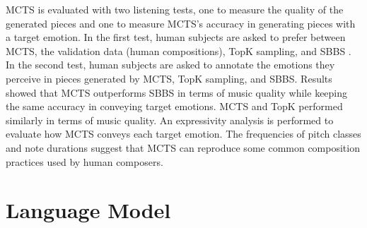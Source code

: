 MCTS is evaluated with two listening tests, one to measure the quality of the generated pieces and one to measure MCTS's accuracy in generating pieces with a target emotion. In the first test, human subjects are asked to prefer between MCTS, the validation data (human compositions), TopK sampling, and SBBS \cite{ferreira2020computer}. In the second test, human subjects are asked to annotate the emotions they perceive in pieces generated by MCTS, TopK sampling, and SBBS. Results showed that MCTS outperforms SBBS in terms of music quality while keeping the same accuracy in conveying target emotions. MCTS and TopK performed similarly in terms of music quality. An expressivity analysis \cite{smith2010analyzing} is performed to evaluate how MCTS conveys each target emotion. The frequencies of pitch classes and note durations suggest that MCTS can reproduce some common composition practices used by human composers.



\section{Language Model}

